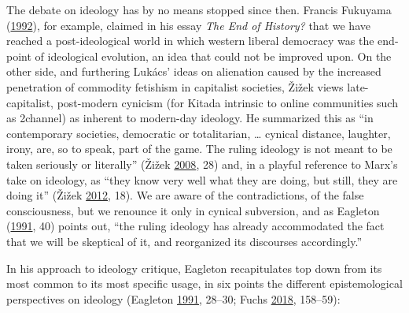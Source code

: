 \documentclass[10pt,british,A4paper,oneside]{memoir}
\begin{document}
The debate on ideology has by no means stopped since then. Francis
Fukuyama (\protect\hyperlink{ref-fukuyama_end_1992}{1992}), for example,
claimed in his essay \emph{The End of History?} that we have reached a
post-ideological world in which western liberal democracy was the
end-point of ideological evolution, an idea that could not be improved
upon. On the other side, and furthering Lukács' ideas on alienation
caused by the increased penetration of commodity fetishism in capitalist
societies, Žižek views late-capitalist, post-modern cynicism (for Kitada
intrinsic to online communities such as 2channel) as inherent to
modern-day ideology. He summarized this as ``in contemporary societies,
democratic or totalitarian, \ldots{} cynical distance, laughter, irony,
are, so to speak, part of the game. The ruling ideology is not meant to
be taken seriously or literally'' (Žižek
\protect\hyperlink{ref-zizek_sublime_2008}{2008}, 28) and, in a playful
reference to Marx's take on ideology, as ``they know very well what they
are doing, but still, they are doing it'' (Žižek
\protect\hyperlink{ref-zizek_mapping_2012}{2012}, 18). We are aware of
the contradictions, of the false consciousness, but we renounce it only
in cynical subversion, and as Eagleton
(\protect\hyperlink{ref-eagleton_ideology:_1991}{1991}, 40) points out,
``the ruling ideology has already accommodated the fact that we will be
skeptical of it, and reorganized its discourses accordingly.''

In his approach to ideology critique, Eagleton recapitulates top down
from its most common to its most specific usage, in six points the
different epistemological perspectives on ideology (Eagleton
\protect\hyperlink{ref-eagleton_ideology:_1991}{1991}, 28--30; Fuchs
\protect\hyperlink{ref-fuchs_racism_2018}{2018}, 158--59):
\end{document}
